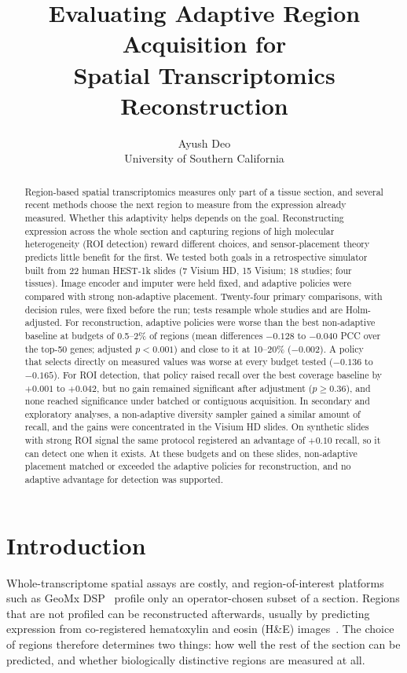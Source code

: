 \documentclass{article}
\title{Evaluating Adaptive Region Acquisition for\\
Spatial Transcriptomics Reconstruction}
\author{%
  Ayush Deo \\
  University of Southern California \\
}
\begin{document}
\maketitle

\begin{abstract}
Region-based spatial transcriptomics measures only part of a tissue section, and several recent methods
choose the next region to measure from the expression already measured. Whether this adaptivity helps
depends on the goal. Reconstructing expression across the whole section and capturing regions of high
molecular heterogeneity (ROI detection) reward different choices, and sensor-placement theory predicts
little benefit for the first. We tested both goals in a retrospective simulator built from 22 human HEST-1k
slides (7 Visium HD, 15 Visium; 18 studies; four tissues). Image encoder and imputer were held fixed, and
adaptive policies were compared with strong non-adaptive placement. Twenty-four primary comparisons, with
decision rules, were fixed before the run; tests resample whole studies and are Holm-adjusted. For
reconstruction, adaptive policies were worse than the best non-adaptive baseline at budgets of 0.5--2\% of
regions (mean differences $-0.128$ to $-0.040$ PCC over the top-50 genes; adjusted $p<0.001$) and close to it
at 10--20\% ($-0.002$). A policy that selects directly on measured values was worse at every budget tested
($-0.136$ to $-0.165$). For ROI detection, that policy raised recall over the best coverage baseline by
$+0.001$ to $+0.042$, but no gain remained significant after adjustment ($p\ge0.36$), and none reached
significance under batched or contiguous acquisition. In secondary and exploratory analyses, a non-adaptive
diversity sampler gained a similar amount of recall, and the gains were concentrated in the Visium HD slides.
On synthetic slides with strong ROI signal the same protocol registered an advantage of $+0.10$ recall, so it
can detect one when it exists. At these budgets and on these slides, non-adaptive placement matched or exceeded
the adaptive policies for reconstruction, and no adaptive advantage for detection was supported.
\end{abstract}

\section{Introduction}

Whole-transcriptome spatial assays are costly, and region-of-interest platforms such as GeoMx
DSP~\citep{merritt2020geomx} profile only an operator-chosen subset of a section. Regions that are not
profiled can be reconstructed afterwards, usually by predicting expression from co-registered hematoxylin and
eosin (H\&E) images~\citep{jaume2024hest,xie2023bleep}. The choice of regions therefore determines two
things: how well the rest of the section can be predicted, and whether biologically distinctive regions are
measured at all.
\end{document}
